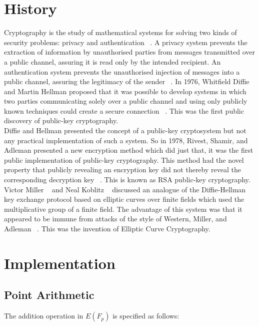 \documentclass[11pt]{article}
\begin{document}
\section{History}

Cryptography is the study of mathematical systems for solving two kinds of security problems: privacy and authentication ~\cite{1055638}. 
A privacy system prevents the extraction of information by unauthorised parties from messages transmitted over a public channel, assuring it is read only by the intended recipient. 
An authentication system prevents the unauthorised injection of messages into a public channel, assuring the legitimacy of the sender ~\cite{1055638}.
In 1976, Whitfield Diffie and Martin Hellman proposed that it was possible to develop systems in which two parties communicating solely over a public channel and using only publicly known techniques could create a secure connection ~\cite{1055638}.
This was the first public discovery of public-key cryptography.
\\
Diffie and Hellman presented the concept of a public-key cryptosystem but not any practical implementation of such a system. 
So in 1978, Rivest, Shamir, and Adleman presented a new encryption method which did just that, it was the first public implementation of public-key cryptography. 
This method had the novel property that publicly revealing an encryption key did not thereby reveal the corresponding decryption key ~\cite{10.1145/359340.359342}. 
This is known as RSA public-key cryptography.
\\
Victor Miller ~\cite{10.1007/3-540-39799-X_31} and Neal Koblitz ~\cite{koblitz1987elliptic} discussed an analogue of the Diffie-Hellman key exchange protocol based on elliptic curves over finite fields which used the multiplicative group of a finite field.
The advantage of this system was that it appeared to be immune from attacks of the style of Western, Miller, and Adleman ~\cite{10.1007/3-540-39799-X_31,4568001}.
This was the invention of Elliptic Curve Cryptography.


\section{Implementation}

\subsection{Point Arithmetic} \label{Point Arithmetic}
The addition operation in $E(F_p)$ is specified as follows:
\end{document}
